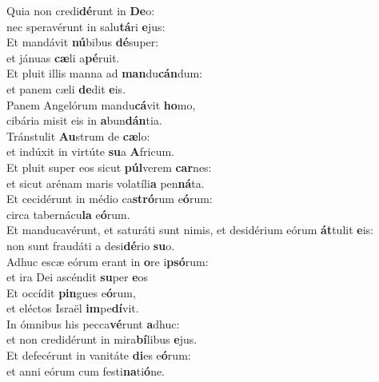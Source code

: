 \evenverse Quia non credi\textbf{dé}runt in \textbf{De}o:~\*\\
\evenverse nec speravérunt in salu\textbf{tá}ri \textbf{e}jus:\\
\oddverse Et mandávit \textbf{nú}bibus \textbf{dé}super:~\*\\
\oddverse et jánuas \textbf{cæ}li a\textbf{pé}ruit.\\
\evenverse Et pluit illis manna ad \textbf{man}du\textbf{cán}dum:~\*\\
\evenverse et panem cæli \textbf{de}dit \textbf{e}is.\\
\oddverse Panem Angelórum mandu\textbf{cá}vit \textbf{ho}mo,~\*\\
\oddverse cibária misit eis in \textbf{a}bun\textbf{dán}tia.\\
\evenverse Tránstulit \textbf{Au}strum de \textbf{cæ}lo:~\*\\
\evenverse et indúxit in virtúte \textbf{su}a \textbf{A}fricum.\\
\oddverse Et pluit super eos sicut \textbf{púl}verem \textbf{car}nes:~\*\\
\oddverse et sicut arénam maris volatíli\textbf{a} pen\textbf{ná}ta.\\
\evenverse Et cecidérunt in médio ca\textbf{stró}rum e\textbf{ó}rum:~\*\\
\evenverse circa tabernácu\textbf{la} e\textbf{ó}rum.\\
\oddverse Et manducavérunt, et saturáti sunt nimis, et desidérium eórum \textbf{át}tulit \textbf{e}is:~\*\\
\oddverse non sunt fraudáti a desi\textbf{dé}rio \textbf{su}o.\\
\evenverse Adhuc escæ eórum erant in \textbf{o}re i\textbf{psó}rum:~\*\\
\evenverse et ira Dei ascéndit \textbf{su}per \textbf{e}os\\
\oddverse Et occídit \textbf{pin}gues e\textbf{ó}rum,~\*\\
\oddverse et eléctos Israël \textbf{im}pe\textbf{dí}vit.\\
\evenverse In ómnibus his pecca\textbf{vé}runt \textbf{a}dhuc:~\*\\
\evenverse et non credidérunt in mira\textbf{bí}libus \textbf{e}jus.\\
\oddverse Et defecérunt in vanitáte \textbf{di}es e\textbf{ó}rum:~\*\\
\oddverse et anni eórum cum festi\textbf{na}ti\textbf{ó}ne.\\
